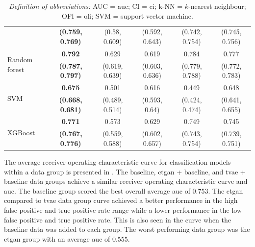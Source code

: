\documentclass[12pt, a4paper]{article}
\begin{document}
\begin{table}
{\begin{tabular}{lccccc}
                                                 & \textbf{(0.759, 0.769)} & (0.58, 0.609)  & (0.592, 0.643) & (0.742, 0.754)            & (0.745, 0.756)           \\[0.5em]
            \multirow{2}{*}{Random forest}       & \textbf{0.792}          & 0.629          & 0.619          & 0.784                     & 0.777                    \\
                                                 & \textbf{(0.787, 0.797)} & (0.619, 0.639) & (0.603, 0.636) & (0.779, 0.788)            & (0.772, 0.783)           \\[0.5em]
            \multirow{2}{*}{SVM}                 & \textbf{0.675}          & 0.501          & 0.616          & 0.449                     & 0.648                    \\
                                                 & \textbf{(0.668, 0.681)} & (0.489, 0.514) & (0.593, 0.64)  & (0.424, 0.474)            & (0.641, 0.655)           \\[0.5em]
            \multirow{2}{*}{XGBoost}             & \textbf{0.771}          & 0.573          & 0.629          & 0.749                     & 0.745                    \\
                                                 & \textbf{(0.767, 0.776)} & (0.559, 0.588) & (0.602, 0.657) & (0.743, 0.754)            & (0.739, 0.751)           \\
            \bottomrule
        \end{tabular}

    }
    \caption*{\small \textit{Definition of abbreviations:} AUC = \acrlong{auc}; CI = \acrlong{ci}; k-NN = $k$-nearest neighbour; OFI = \acrlong{ofi}; SVM = support vector machine.}
\end{table}

The average receiver operating characteristic curve for classification models within a data group is presented in . The baseline, \acrshort{ctgan} + baseline, and \acrshort{tvae} + baseline data groups achieve a similar receiver operating characteristic curve and \acrshort{auc}. The baseline group scored the best overall average \acrshort{auc} of 0.753. The \acrshort{ctgan} compared to \acrshort{tvae} data group curve achieved a better performance in the high false positive and true positive rate range while a lower performance in the low false positive and true positive rate. This is also seen in the curve when the baseline data was added to each group. The worst performing data group was the \acrshort{ctgan} group with an average \acrshort{auc} of 0.555.
\end{document}
